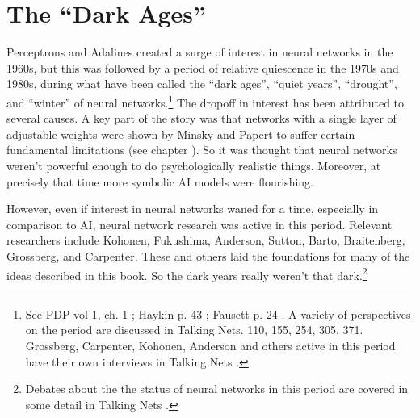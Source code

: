 \section{The ``Dark Ages''}\label{dark_ages}


Perceptrons and Adalines created a surge of interest in neural networks in the 1960s, but this was followed by a period of relative quiescence in the 1970s and 1980s, during what have been called the ``dark ages'', ``quiet years'', ``drought'', and ``winter'' of neural networks.\footnote{See PDP vol 1, ch. 1 \cite{rumelhart1986parallel}; Haykin p. 43 \cite{haykin1998neural}; Fausett p. 24 \cite{fausett1994fundamentals}. A variety of perspectives on the period are discussed in Talking Nets. 110, 155, 254, 305, 371. Grossberg, Carpenter, Kohonen, Anderson and others active in this period have their own interviews in Talking Nets \cite{anderson2000talking}.}  The dropoff in interest has been attributed to several causes. A key part of the story was that networks with a single layer of adjustable weights were shown by Minsky and Papert to suffer certain fundamental limitations \cite{minsky1969perceptrons} (see chapter ). So it was thought that neural networks weren't powerful enough to do psychologically realistic things. Moreover, at precisely that time more symbolic AI models were flourishing. 

However, even if interest in neural networks waned for a time, especially in comparison to AI, neural network research was active in this period. Relevant researchers include Kohonen, Fukushima, Anderson, Sutton, Barto, Braitenberg, Grossberg, and Carpenter. These and others laid the foundations for many of the ideas described in this book. So the dark years really weren't that dark.\footnote{Debates about the the status of neural networks in this period are covered in some detail in Talking Nets \cite{anderson2000talking}.} 

